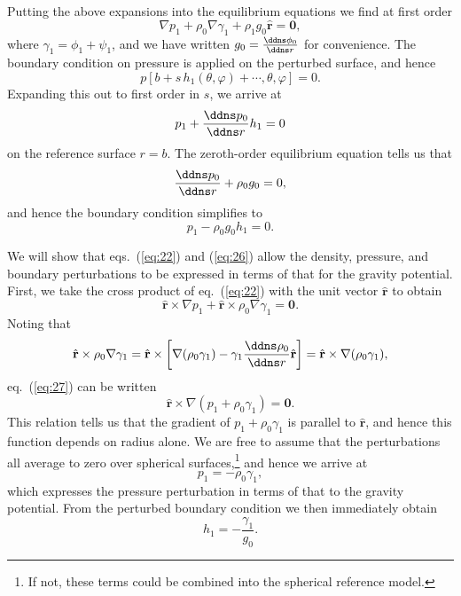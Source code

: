 Putting the above expansions into the equilibrium equations we find at first order
\begin{equation}
\nabla p_{1}+\rho_{0}\nabla\gamma_{1}+\rho_{1}g_{0}\hat{\mathbf{r}}=\mathbf{0},
\label{eq:22}
\end{equation}
where $\gamma_{1}=\phi_{1}+\psi_{1}$, and we have written $g_{0}=\frac{\ddns \phi_{0}}{\ddns r}$ for convenience. 
The boundary condition on pressure is applied on the perturbed surface, and hence
\begin{equation}
p[b+s\,h_{1}(\theta,\varphi)+\cdots,\theta,\varphi]=0.
\label{eq:23}
\end{equation}
Expanding this out to first order in $s$, we arrive at
\begin{equation}
p_{1}+\frac{\ddns p_{0}}{\ddns r}h_{1}=0
\label{eq:24}
\end{equation}
on the reference surface $r=b$. The zeroth-order equilibrium equation tells us that
\begin{equation}
\frac{\ddns p_{0}}{\ddns r}+\rho_{0}g_{0}=0,
\label{eq:25}
\end{equation}
and hence the boundary condition simplifies to
\begin{equation}
p_{1}-\rho_{0}g_{0}h_{1}=0.
\label{eq:26}
\end{equation}


We will show that eqs.~(\ref{eq:22}) and (\ref{eq:26}) allow the density, pressure, and boundary perturbations to be expressed in terms of 
that for the gravity potential. First, we take the cross product of eq.~(\ref{eq:22}) with the unit vector $\hat{\mathbf{r}}$ to obtain
\begin{equation}
\hat{\mathbf{r}}\times\nabla p_{1}+\hat{\mathbf{r}}\times\rho_{0}\nabla\gamma_{1}=\mathbf{0}.
\label{eq:27}
\end{equation}
Noting that
\begin{equation}
\hat{\mathbf{r}}\times\rho_{0}\nabla\gamma_{1}=\hat{\mathbf{r}}\times\left[
    \nabla(\rho_{0}\gamma_{1})-\gamma_{1}\frac{\ddns \rho_{0}}{\ddns r}\hat{\mathbf{r}}
    \right]=\hat{\mathbf{r}}\times\nabla(\rho_{0}\gamma_{1}),
\label{eq:28}
\end{equation}
eq.~(\ref{eq:27}) can be written
\begin{equation}
\hat{\mathbf{r}}\times\nabla(p_{1}+\rho_{0}\gamma_{1})=\mathbf{0}.
\label{eq:29}
\end{equation}
This relation tells us that the gradient of $p_{1}+\rho_{0}\gamma_{1}$ is parallel to $\hat{\mathbf{r}}$, and hence this function
 depends on radius alone. We are free to assume that the perturbations all average to zero over spherical surfaces,\footnote{If not, 
 these terms could be combined into the spherical reference model.} and hence we arrive at
\begin{equation}
p_{1}=-\rho_{0}\gamma_{1},
\label{eq:30}
\end{equation}
which expresses the pressure perturbation in terms of that to the gravity potential. From the perturbed boundary 
condition we then immediately obtain
\begin{equation}
h_{1}=-\frac{\gamma_{1}}{g_{0}}.
\label{eq:31}
\end{equation}

